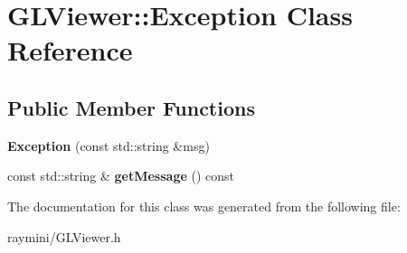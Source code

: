 \hypertarget{class_g_l_viewer_1_1_exception}{
\section{GLViewer::Exception Class Reference}
\label{class_g_l_viewer_1_1_exception}
}
\subsection*{Public Member Functions}
\begin{DoxyCompactItemize}
\item 
\hypertarget{class_g_l_viewer_1_1_exception_a4907c5b4b29596527e4c071b407b6a39}{
{\bfseries Exception} (const std::string \&msg)}
\label{class_g_l_viewer_1_1_exception_a4907c5b4b29596527e4c071b407b6a39}

\item 
\hypertarget{class_g_l_viewer_1_1_exception_a11befe3468ae6137a932a4ca32d9ce5e}{
const std::string \& {\bfseries getMessage} () const }
\label{class_g_l_viewer_1_1_exception_a11befe3468ae6137a932a4ca32d9ce5e}

\end{DoxyCompactItemize}


The documentation for this class was generated from the following file:\begin{DoxyCompactItemize}
\item 
raymini/GLViewer.h\end{DoxyCompactItemize}
